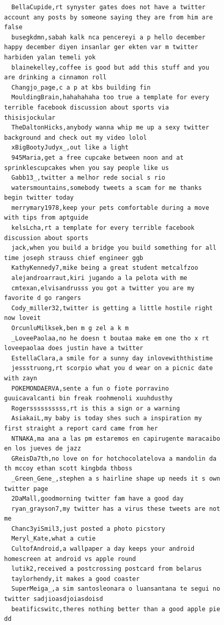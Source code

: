 \begin{figure}[htpb]
\begin{verbatim}
  BellaCupide,rt synyster gates does not have a twitter account any posts by someone saying they are from him are false
  busegkdmn,sabah kalk nca pencereyi a p hello december happy december diyen insanlar ger ekten var m twitter harbiden yalan temeli yok
  blainekelley,coffee is good but add this stuff and you are drinking a cinnamon roll
  Changjo_page,c a p at kbs building fin
  MouldingBrain,hahahahaha too true a template for every terrible facebook discussion about sports via thisisjockular
  TheDaltonHicks,anybody wanna whip me up a sexy twitter background and check out my video lolol
  xBigBootyJudyx_,out like a light
  945Maria,get a free cupcake between noon and at sprinklescupcakes when you say people like us
  Gabb13_,twitter a melhor rede social s rio
  watersmountains,somebody tweets a scam for me thanks begin twitter today
  merrymary1978,keep your pets comfortable during a move with tips from aptguide
  kelsLcha,rt a template for every terrible facebook discussion about sports
  jack,when you build a bridge you build something for all time joseph strauss chief engineer ggb
  KathyKennedy7,mike being a great student metcalfzoo
  alejandroarraut,kiri jugando a la pelota with me
  cmtexan,elvisandrusss you got a twitter you are my favorite d go rangers
  Cody_miller32,twitter is getting a little hostile right now loveit
  OrcunluMilksek,ben m g zel a k m
  _LoveePaolaa,no he doesn t boutaa make em one tho x rt loveepaolaa does justin have a twitter
  EstellaClara,a smile for a sunny day inlovewiththistime
  jessstruong,rt scorpio what you d wear on a picnic date with zayn
  POKEMONDAERVA,sente a fun o fiote porravino guuicavalcanti bin freak roohmenoli xuuhdusthy
  Rogerssssssssss,rt is this a sign or a warning
  AsiakaiL,my baby is today shes such a inspiration my first straight a report card came from her
  NTNAKA,ma ana a las pm estaremos en capirugente maracaibo en los jueves de jazz
  GReisDa7th,no love on for hotchocolatelova a mandolin da th mccoy ethan scott kingbda thboss
  _Green_Gene_,stephen a s hairline shape up needs it s own twitter page
  2DaMall,goodmorning twitter fam have a good day
  ryan_grayson7,my twitter has a virus these tweets are not me
  Chanc3yiSmil3,just posted a photo picstory
  Meryl_Kate,what a cutie
  CultofAndroid,a wallpaper a day keeps your android homescreen at android vs apple round
  lutik2,received a postcrossing postcard from belarus
  taylorhendy,it makes a good coaster
  SuperMeiga_,a sim santosleonara o luansantana te segui no twitter sadjioasdjoiasdoisd
  beatificswitc,theres nothing better than a good apple pie dd

\end{verbatim}
\end{figure}
